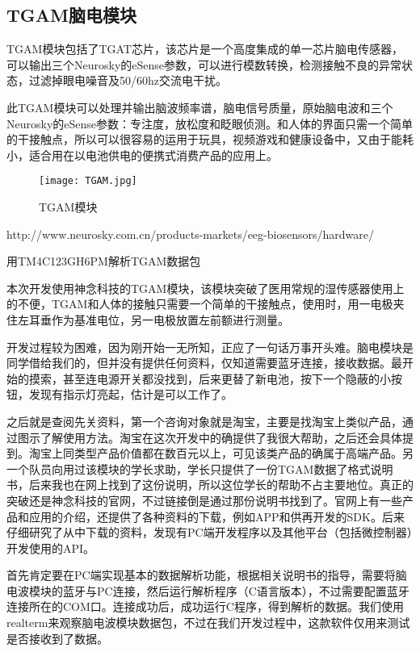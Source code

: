 \subsection{TGAM脑电模块}
TGAM模块包括了TGAT芯片，该芯片是一个高度集成的单一芯片脑电传感器，可以输出三个Neurosky的eSense参数，可以进行模数转换，检测接触不良的异常状态，过滤掉眼电噪音及50/60hz交流电干扰。

此TGAM模块可以处理并输出脑波频率谱，脑电信号质量，原始脑电波和三个Neurosky的eSense参数：专注度，放松度和眨眼侦测。和人体的界面只需一个简单的干接触点，所以可以很容易的运用于玩具，视频游戏和健康设备中，又由于能耗小，适合用在以电池供电的便携式消费产品的应用上。

\begin{figure}[htbp]
\centering
\texttt{[image: TGAM.jpg]}
\caption{TGAM模块} 
\label{TGAM}
\end{figure}

http://www.neurosky.com.cn/products-markets/eeg-biosensors/hardware/

用TM4C123GH6PM解析TGAM数据包

本次开发使用神念科技的TGAM模块，该模块突破了医用常规的湿传感器使用上的不便，TGAM和人体的接触只需要一个简单的干接触点，使用时，用一电极夹住左耳垂作为基准电位，另一电极放置左前额进行测量。

开发过程较为困难，因为刚开始一无所知，正应了一句话万事开头难。脑电模块是同学借给我们的，但并没有提供任何资料，仅知道需要蓝牙连接，接收数据。最开始的摸索，甚至连电源开关都没找到，后来更替了新电池，按下一个隐蔽的小按钮，发现有指示灯亮起，估计是可以工作了。

之后就是查阅先关资料，第一个咨询对象就是淘宝，主要是找淘宝上类似产品，通过图示了解使用方法。淘宝在这次开发中的确提供了我很大帮助，之后还会具体提到。淘宝上同类型产品价值都在数百元以上，可见该类产品的确属于高端产品。另一个队员向用过该模块的学长求助，学长只提供了一份TGAM数据了格式说明书，后来我也在网上找到了这份说明，所以这位学长的帮助不占主要地位。真正的突破还是神念科技的官网，不过链接倒是通过那份说明书找到了。官网上有一些产品和应用的介绍，还提供了各种资料的下载，例如APP和供再开发的SDK。后来仔细研究了从中下载的资料，发现有PC端开发程序以及其他平台（包括微控制器）开发使用的API。

首先肯定要在PC端实现基本的数据解析功能，根据相关说明书的指导，需要将脑电波模块的蓝牙与PC连接，然后运行解析程序（C语言版本），不过需要配置蓝牙连接所在的COM口。连接成功后，成功运行C程序，得到解析的数据。我们使用realterm来观察脑电波模块数据包，不过在我们开发过程中，这款软件仅用来测试是否接收到了数据。

